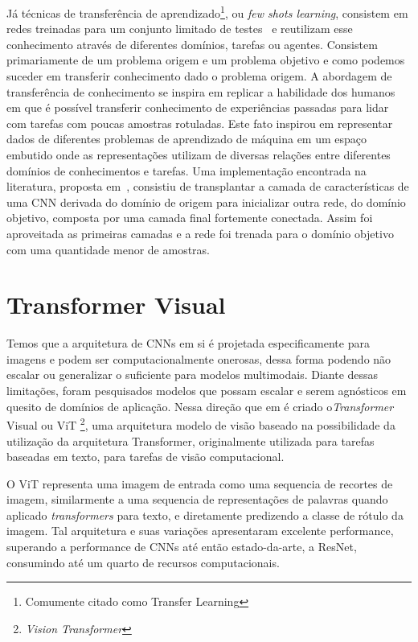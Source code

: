 Já técnicas de transferência de aprendizado\footnote{Comumente citado como Transfer Learning}, ou \textit{few shots learning}, consistem em redes treinadas para um conjunto limitado de testes~\cite{rostami2019learning}
e reutilizam esse conhecimento através de diferentes domínios, tarefas ou agentes. Consistem primariamente de um problema origem e um problema objetivo e como podemos suceder em transferir conhecimento dado o problema origem. A abordagem de transferência de conhecimento se inspira em replicar a habilidade dos humanos em que é possível transferir conhecimento de experiências passadas para lidar com tarefas com poucas amostras rotuladas. Este fato inspirou em representar dados de diferentes problemas de aprendizado de máquina em um espaço embutido onde as representações utilizam de diversas relações entre diferentes domínios de conhecimentos e tarefas. Uma implementação encontrada na literatura, proposta em~\cite{rostami2019learning}, consistiu de transplantar a camada de características de uma CNN derivada do domínio de origem para inicializar outra rede, do domínio objetivo, composta por uma camada final fortemente conectada. Assim foi aproveitada as primeiras camadas e a rede foi trenada para o domínio objetivo com uma quantidade menor de amostras.


\section{Transformer Visual}\label{sec:Cap2_transformer_visual}


Temos que a arquitetura de CNNs em si é projetada especificamente para imagens e podem ser computacionalmente onerosas, dessa forma podendo não escalar ou generalizar o suficiente para modelos multimodais. Diante dessas limitações, foram pesquisados modelos que possam escalar e serem agnósticos em quesito de domínios de aplicação. Nessa direção que em \cite{dosovitskiy2020image} é criado o\textit{Transformer} Visual ou ViT \footnote{\textit{Vision Transformer}}, uma arquitetura modelo de visão baseado na possibilidade da utilização da arquitetura Transformer, originalmente utilizada para tarefas baseadas em texto, para tarefas de visão computacional.

O ViT representa uma imagem de entrada como uma sequencia de recortes de imagem, similarmente a uma sequencia de representações de palavras quando aplicado \textit{transformers} para texto, e diretamente predizendo a classe de rótulo da imagem. Tal arquitetura e suas variações apresentaram excelente performance, superando a performance de CNNs até então estado-da-arte, a ResNet, consumindo até um quarto de recursos computacionais.


